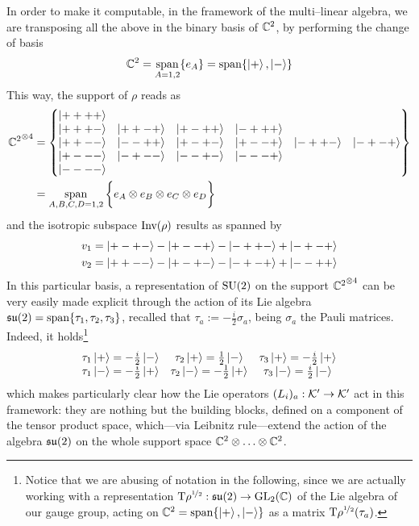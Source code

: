 In order to make it computable, in the framework of the multi--linear algebra, we are transposing all the above in the binary basis of $\mathbb{C}^2$, by performing the change of basis 
$$\mathbb{C}^2=\mathop{\operatorname{span}}_{A=1,2}\{e_A\}=\operatorname{span}\{\left| + \right >,\left| - \right >\}$$
This way, the support of $\rho$ reads as 
\begin{align*}
{\mathbb{C}^2}^{\otimes 4}
&=\left\{\begin{matrix}
\left| ++++ \right >&&&&&\\
\left| +++- \right >&\left| ++-+ \right >&\left| +-++ \right >&\left| -+++ \right >&\\
\left| ++-- \right >&\left| --++ \right >&\left| +-+- \right >&\left| +--+ \right >&\left| -++- \right >&\left| -+-+ \right >\\
\left| +--- \right >&\left| -+-- \right >&\left| --+- \right >&\left| ---+ \right >&\\
\left| ---- \right >\end{matrix}\right\}\\
&=\mathop{\operatorname{span}}_{A,B,C,D=1,2}\bigg\{e_A\otimes e_B\otimes e_C\otimes e_D\bigg\}
\end{align*}
and the isotropic subspace $\text{\normalfont Inv}(\rho)$ results as spanned by
\begin{align*}
    v_1&=\left| +-+- \right >-\left| +--+ \right >-\left| -++- \right >+\left| -+-+ \right >\\
    v_2&=\left| ++-- \right >-\left| +-+- \right >-\left| -+-+ \right >+\left| --++ \right >
\end{align*}
In this particular basis, a representation of $\text{\normalfont SU}(2)$ on the support ${\mathbb{C}^{2}}^{\otimes 4}$ can be very easily made explicit through the action of its Lie algebra $\mathfrak{su}(2)=\operatorname{span}\{\tau_1,\tau_2,\tau_3\}$, recalled that $\tau_a:=-\frac{i}{2}\sigma_a$, being $\sigma_a$ the Pauli matrices. Indeed, it holds\footnote{Notice that we are abusing of notation in the following, since we are actually working with a representation $\text{\normalfont T}\rho^{\nicefrac{1}{2}}:\mathfrak{su}(2)\to\text{\normalfont GL}_2(\mathbb{C})$ of the Lie algebra of our gauge group, acting on $\mathbb{C}^2=\operatorname{span}\{\left| + \right >,\left| - \right >\}$ as a matrix $\text{\normalfont T}\rho^{\nicefrac{1}{2}}(\tau_a)$.}
\begin{equation}\label{tau_i}
    \begin{matrix}
        \tau_1\left| + \right >=-\frac{i}{2}\left| - \right >&\tau_2\left| + \right >=\frac{1}{2}\left| - \right >&\tau_3\left| + \right >=-\frac{i}{2}\left| + \right >\\
        \tau_1\left| - \right >=-\frac{i}{2}\left| + \right >&\tau_2\left| - \right >=-\frac{1}{2}\left| + \right >&\tau_3\left| - \right >=\frac{i}{2}\left| - \right >
    \end{matrix}
\end{equation}
which makes particularly clear how the Lie operators $(L_i)_a:\mathcal{K}'\to\mathcal{K}'$ act in this framework: they are nothing but the building blocks, defined on a component of the tensor product space, which---via Leibnitz rule---extend the action of the algebra $\mathfrak{su}(2)$ on the whole support space $\mathbb{C}^2\otimes\hdots\otimes\mathbb{C}^2$.

